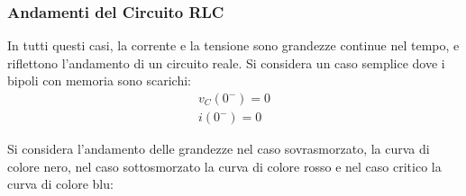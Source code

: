 \documentclass{article}
\numberwithin{equation}{subsection}
\begin{document}
\subsubsection{Andamenti del Circuito RLC}
In tutti questi casi, la corrente e la tensione sono grandezze continue nel tempo, e riflettono l'andamento di un circuito reale. Si considera un caso semplice dove i 
bipoli con memoria sono scarichi:
\begin{gather*}
    v_C(0^-)=0\\
    i(0^-)=0
\end{gather*}

Si considera l'andamento delle grandezze nel caso sovrasmorzato, la curva di colore nero, nel caso sottosmorzato la curva di colore rosso e nel caso critico la curva di colore blu: 
\end{document}
